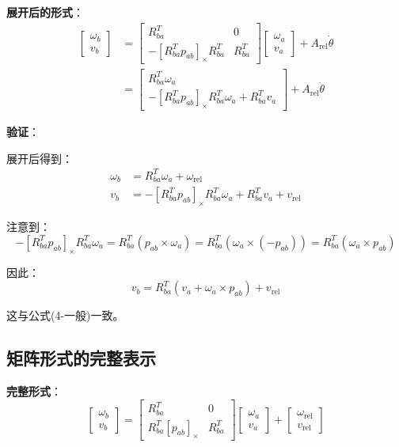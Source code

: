 \documentclass[12pt,a4paper]{article}
\begin{document}
\textbf{展开后的形式}：
\begin{align}
\begin{bmatrix} \omega_b \\ v_b \end{bmatrix} &= \begin{bmatrix}
R_{ba}^T & 0 \\
-[R_{ba}^T p_{ab}]_{\times} R_{ba}^T & R_{ba}^T
\end{bmatrix} \begin{bmatrix} \omega_a \\ v_a \end{bmatrix} + A_{\text{rel}} \dot{\theta} \\
&= \begin{bmatrix}
R_{ba}^T \omega_a \\
-[R_{ba}^T p_{ab}]_{\times} R_{ba}^T \omega_a + R_{ba}^T v_a
\end{bmatrix} + A_{\text{rel}} \dot{\theta}
\end{align}

\textbf{验证}：

展开后得到：
\begin{align}
\omega_b &= R_{ba}^T \omega_a + \omega_{\text{rel}} \\
v_b &= -[R_{ba}^T p_{ab}]_{\times} R_{ba}^T \omega_a + R_{ba}^T v_a + v_{\text{rel}}
\end{align}

注意到：
\begin{equation}
-[R_{ba}^T p_{ab}]_{\times} R_{ba}^T \omega_a = R_{ba}^T (p_{ab} \times \omega_a) = R_{ba}^T (\omega_a \times (-p_{ab})) = R_{ba}^T (\omega_a \times p_{ab})
\end{equation}

因此：
\begin{equation}
v_b = R_{ba}^T (v_a + \omega_a \times p_{ab}) + v_{\text{rel}}
\end{equation}

这与公式(4-一般)一致。

\subsection{矩阵形式的完整表示}

\textbf{完整形式}：
\begin{equation}
\begin{bmatrix} \omega_b \\ v_b \end{bmatrix} = \begin{bmatrix}
R_{ba}^T & 0 \\
R_{ba}^T [p_{ab}]_{\times} & R_{ba}^T
\end{bmatrix} \begin{bmatrix} \omega_a \\ v_a \end{bmatrix} + \begin{bmatrix} \omega_{\text{rel}} \\ v_{\text{rel}} \end{bmatrix} \tag{矩阵形式}
\end{equation}
\end{document}
